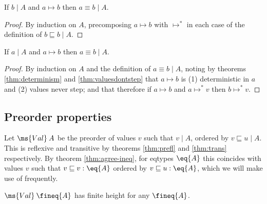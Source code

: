 \documentclass{article}
\newcommand{\ale}{\sqsubseteq}
\newcommand{\aeq}{\equiv}
\newcommand{\step}{\mapsto}
\newcommand{\steps}{\step^*}
\newcommand{\lr}[2]{#2\mathrel{|}#1}
\begin{document}
\begin{lemma}
  If $\lr{A}{b}$ and $a \step b$ then $\lr{A}{a \aeq b}$.
\end{lemma}

\begin{proof}
  By induction on $A$, precomposing $a \step b$ with $\steps$ in each case of
  the definition of $\lr{A}{b \ale b}$.
\end{proof}

\begin{lemma}
  If $\lr{A}{a}$ and $a \step b$ then $\lr{A}{a \aeq b}$.
\end{lemma}

\begin{proof}
  By induction on $A$ and the definition of $\lr{A}{a \aeq b}$, noting by
  theorems \ref{thm:determinism} and \ref{thm:valuesdontstep} that $a \step b$
  is (1) deterministic in $a$ and (2) values never step; and that therefore if
  $a \step b$ and $a \steps v$ then $b \steps v$.
\end{proof}


\subsection{Preorder properties}

\newcommand{\Val}[1]{\ms{Val}\:#1}

\begin{definition}
  Let $\Val{A}$ be the preorder of values $v$ such that $\lr{A}{v}$, ordered by
  $\lr{A}{v \ale u}$. This is reflexive and transitive by theorems
  \ref{thm:prefl} and \ref{thm:trans} respectively. By theorem
  \ref{thm:agree-ineq}, for eqtypes $\eq{A}$ this coincides with values $v$ such
  that $v \ale v : \eq{A}$ ordered by $v \ale u : \eq{A}$, which we will make
  use of frequently.
\end{definition}

\begin{theorem}\label{thm:finite-height}
  $\Val{\fineq{A}}$ has finite height for any $\fineq{A}$.
\end{theorem}
\end{document}
